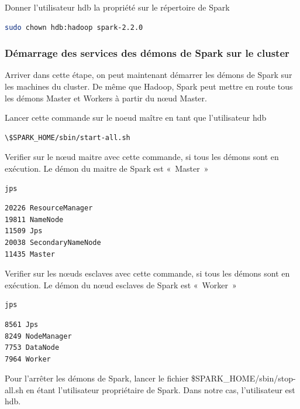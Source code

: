 \documentclass[12pt,english]{book}
\begin{document}
Donner l’utilisateur hdb la propriété sur le répertoire de Spark

\begin{lstlisting}[language=bash, frame=single]
sudo chown hdb:hadoop spark-2.2.0
\end{lstlisting}

\subsubsection{Démarrage des services des démons de Spark sur le cluster}

Arriver dans cette étape, on peut maintenant démarrer les démons de Spark sur les machines du cluster. De même que Hadoop, Spark peut mettre en route tous les démons Master et Workers à partir du nœud Master.

Lancer cette commande sur le noeud maître en tant que l’utilisateur hdb
\begin{lstlisting}[language=bash, frame=single]
\$SPARK_HOME/sbin/start-all.sh 
\end{lstlisting}

Verifier sur le nœud maitre avec cette commande, si tous les démons sont en exécution. Le démon du maitre de Spark est « Master »

\begin{lstlisting}[language=bash, frame=single]
jps
\end{lstlisting}

\begin{lstlisting}[language=bash, frame=single]
20226 ResourceManager
19811 NameNode
11509 Jps
20038 SecondaryNameNode
11435 Master
\end{lstlisting}

Verifier sur les nœuds esclaves avec cette commande, si tous les démons sont en exécution. Le démon du nœud esclaves de Spark est « Worker »

\begin{lstlisting}[language=bash, frame=single]
jps
\end{lstlisting}

\begin{lstlisting}[language=bash, frame=single]
8561 Jps
8249 NodeManager
7753 DataNode
7964 Worker
\end{lstlisting}

Pour l’arrêter les démons de Spark, lancer le fichier \$SPARK\_HOME/sbin/stop-all.sh en étant l’utilisateur propriétaire de Spark.
Dans notre cas, l’utilisateur est hdb. 
\end{document}
